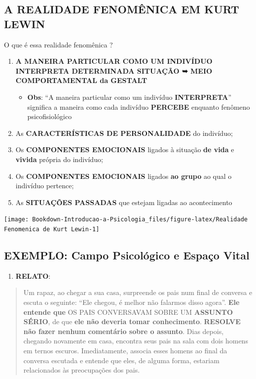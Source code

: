 \documentclass[
]{book}
\providecommand{\tightlist}{%
  \setlength{\itemsep}{0pt}\setlength{\parskip}{0pt}}
\begin{document}
\hypertarget{a-realidade-fenomuxeanica-em-kurt-lewin-1}{%
\subsection{A REALIDADE FENOMÊNICA EM KURT LEWIN}\label{a-realidade-fenomuxeanica-em-kurt-lewin-1}}

O que é essa realidade fenomênica ?

\begin{enumerate}
\def\labelenumi{\arabic{enumi}.}
\tightlist
\item
  \textbf{A MANEIRA PARTICULAR COMO UM INDIVÍDUO INTERPRETA DETERMINADA SITUAÇÃO ➥ MEIO COMPORTAMENTAL da GESTALT}

  \begin{itemize}
  \tightlist
  \item
    \textbf{Obs}: ``A maneira particular como um indivíduo \textbf{INTERPRETA}'' significa a maneira como cada indivíduo \textbf{PERCEBE} enquanto fenômeno psicofisiológico
  \end{itemize}
\item
  As \textbf{CARACTERÍSTICAS DE PERSONALIDADE} do indivíduo;
\item
  Os \textbf{COMPONENTES EMOCIONAIS} ligados à situação \textbf{de vida} e \textbf{vivida} própria do indivíduo;
\item
  Os \textbf{COMPONENTES EMOCIONAIS} ligados \textbf{ao grupo} ao qual o indivíduo pertence;
\item
  As \textbf{SITUAÇÕES PASSADAS} que estejam ligadas ao acontecimento
\end{enumerate}

\texttt{[image: Bookdown-Introducao-a-Psicologia\_files/figure-latex/Realidade Fenomenica de Kurt Lewin-1]}

\hypertarget{exemplo-campo-psicoluxf3gico-e-espauxe7o-vital-1}{%
\subsection{EXEMPLO: Campo Psicológico e Espaço Vital}\label{exemplo-campo-psicoluxf3gico-e-espauxe7o-vital-1}}

\begin{enumerate}
\def\labelenumi{\arabic{enumi}.}
\tightlist
\item
  \textbf{RELATO}:
\end{enumerate}

\begin{quote}
Um rapaz, ao chegar a sua casa, surpreende os pais num final de conversa e escuta o seguinte: ``Ele chegou, é melhor não falarmos disso agora''. \textbf{Ele entende que} OS PAIS CONVERSAVAM SOBRE UM \textbf{ASSUNTO SÉRIO}, de que \textbf{ele não deveria tomar conhecimento}. \textbf{RESOLVE não fazer nenhum comentário sobre o assunto}. Dias depois, chegando novamente em casa, encontra seus pais na sala com dois homens em ternos escuros. Imediatamente, associa esses homens ao final da conversa escutada e entende que eles, de alguma forma, estariam relacionados às preocupações dos pais.
\end{quote}
\end{document}
